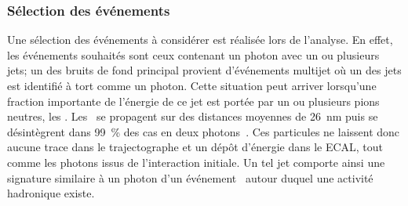 \subsubsection{Sélection des événements}
Une sélection des événements à considérer est réalisée lors de l'analyse.
En effet, les événements souhaités sont ceux contenant un photon avec un ou plusieurs jets;
un des bruits de fond principal provient d'événements multijet où un des jets est identifié à tort comme un photon.
Cette situation peut arriver lorsqu'une fraction importante de l'énergie de ce jet est portée par un ou plusieurs pions neutres, les \pionnull.
Les \pionnull\ se propagent sur des distances moyennes de \SI{26}{\nano\meter} puis se désintègrent dans \SI{99}{\%} des cas en deux photons~\cite{PDG_booklet_2020}.
Ces particules ne laissent donc aucune trace dans le trajectographe et un dépôt d'énergie dans le ECAL, tout comme les photons issus de l'interaction initiale.
Un tel jet comporte ainsi une signature similaire à un photon d'un événement \Gjet\ autour duquel une activité hadronique existe.
